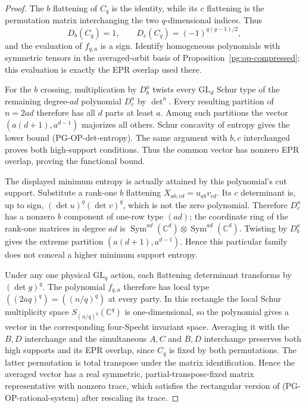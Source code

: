 \begin{proof}
The $b$ flattening of $C_q$ is the identity, while its $c$ flattening is
the permutation matrix interchanging the two $q$-dimensional indices.
Thus
\[
 D_b(C_q)=1,\qquad D_c(C_q)=(-1)^{q(q-1)/2},
\]
and the evaluation of $f_{q,a}$ is a sign. Identify homogeneous
polynomials with symmetric tensors in the averaged-orbit basis of
Proposition~\ref{pg:op-compressed}; this evaluation is exactly the EPR
overlap used there.

For the $b$ crossing, multiplication by $D_b^a$ twists every
$\mathrm{GL}_d$ Schur type of the remaining degree-$ad$ polynomial
$D_c^a$ by $\det^a$. Every resulting partition of $n=2ad$ therefore has
all $d$ parts at least $a$. Among such partitions the vector
$(a(d+1),a^{d-1})$ majorizes all others. Schur concavity of entropy gives
the lower bound (PG-OP-det-entropy). The same argument with $b,c$
interchanged proves both high-support conditions. Thus the common
vector has nonzero EPR overlap, proving the functional bound.

The displayed minimum entropy is actually attained by this polynomial's
cut support. Substitute a rank-one $b$ flattening
$X_{ab,cd}=u_{ab}v_{cd}$. Its $c$ determinant is, up to sign,
$(\det u)^q(\det v)^q$, which is not the zero polynomial. Therefore
$D_c^a$ has a nonzero $b$ component of one-row type $(ad)$; the
coordinate ring of the rank-one matrices in degree $ad$ is
$\operatorname{Sym}^{ad}(\mathbb C^d)\otimes
\operatorname{Sym}^{ad}(\mathbb C^d)$. Twisting by $D_b^a$ gives the
extreme partition $(a(d+1),a^{d-1})$. Hence this particular family does
not conceal a higher minimum support entropy.

Under any one physical $\mathrm{GL}_q$ action, each flattening
determinant transforms by $(\det g)^q$. The polynomial $f_{q,a}$
therefore has local type $( (2aq)^q )=( (n/q)^q )$ at every party.
In this rectangle the local Schur multiplicity space
$S_{(n/q)^q}(\mathbb C^q)$ is one-dimensional, so the polynomial gives
a vector in the corresponding four-Specht invariant space. Averaging
it with the $B,D$ interchange and the simultaneous $A,C$ and $B,D$
interchange preserves both high supports and its EPR overlap, since
$C_q$ is fixed by both permutations. The latter permutation is total
transpose under the matrix identification. Hence the averaged vector
has a real symmetric, partial-transpose-fixed matrix representative
with nonzero trace, which satisfies the rectangular version of
(PG-OP-rational-system) after rescaling its trace.


\end{proof}
